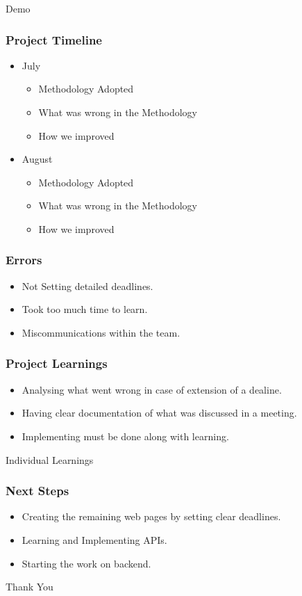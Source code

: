\documentclass{beamer}
\begin{document}
\begin{frame}
    \center\Huge Demo
\end{frame}

\begin{frame}
\frametitle{Project Timeline}
\begin{itemize}
  \item July
  \begin{itemize}
    \item Methodology Adopted
    \item What was wrong in the Methodology
    \item How we improved
  \end{itemize}
  \item August
  \begin{itemize}
    \item Methodology Adopted
    \item What was wrong in the Methodology
    \item How we improved
  \end{itemize}

\end{itemize}
\end{frame}

\begin{frame}
  \frametitle{Errors}
  \begin{itemize}
    \item Not Setting detailed deadlines.
    \item Took too much time to learn.
    \item Miscommunications within the team.
  \end{itemize}
  \end{frame}

\begin{frame}
\frametitle{Project Learnings}
\begin{itemize}
  \item Analysing what went wrong in case of extension of a dealine.
  \item Having clear documentation of what was discussed in a meeting.
  \item Implementing must be done along with learning.
\end{itemize}
\end{frame}

\begin{frame}
  \center\Huge Individual Learnings
\end{frame}

\begin{frame}
\frametitle{Next Steps}
\begin{itemize}
  \item Creating the remaining web pages by setting clear deadlines.
  \item Learning and Implementing APIs.
  \item Starting the work on backend.
\end{itemize}
\end{frame}

\begin{frame}
  \center\Huge Thank You
\end{frame}
\end{document}

